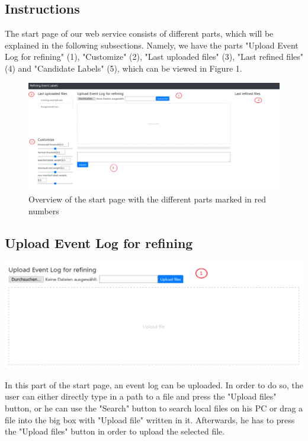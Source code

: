 \documentclass[notitlepage]{article}
\begin{document}
\begin{flushleft}

\section{Instructions}

The start page of our web service consists of different parts, which will be explained in the following subsections. Namely, we have the parts "Upload Event Log for refining" (1), "Customize" (2), "Last uploaded files" (3), "Last refined files" (4) and "Candidate Labels" (5), which can be viewed in Figure 1.

\begin{figure}[h]
\includegraphics[scale=0.33]{startpage.png}
\caption{Overview of the start page with the different parts marked in red numbers}
\end{figure}

\subsection{Upload Event Log for refining}

\includegraphics[scale=0.5]{uploadEventLog.png}

In this part of the start page, an event log can be uploaded. In order to do so, the user can either directly type in a path to a file and press the "Upload files" button, or he can use the "Search" button to search local files on his PC or drag a file into the big box with "Upload file" written in it. 
Afterwards, he has to press the "Upload files" button in order to upload the selected file. 


\end{flushleft}
\end{document}
